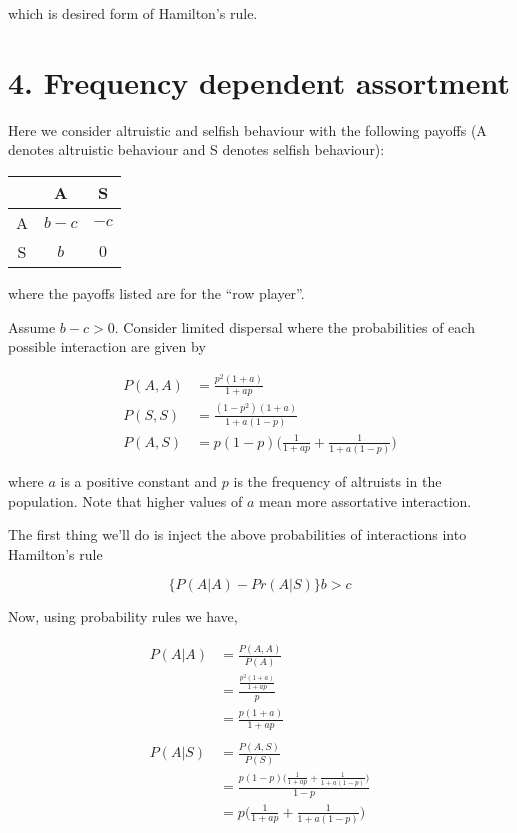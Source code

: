 \documentclass{article}
\begin{document}
which is desired form of Hamilton's rule.

\section*{4. Frequency dependent assortment}

Here we consider altruistic and selfish behaviour with the following
payoffs (A denotes altruistic behaviour and S denotes selfish
behaviour):

\begin{center}
\begin{tabular}{ccc}
    & A & S \\
    \hline
    A & $b - c$ & $-c$ \\
    S & $b$ & $0$ \\
    \hline
\end{tabular}
\end{center}

where the payoffs listed are for the ``row player''.

Assume $b - c > 0$. Consider limited dispersal where the probabilities
of each possible interaction are given by

\begin{align*}
    P(A,A) &= \frac{p^2 (1 + a)}{1 + a p} \\
    P(S,S) &= \frac{(1 - p^2) (1 + a)}{1 + a (1 - p)} \\
    P(A,S) &= p (1 - p) \bigg(\frac{1}{1 + a p} + \frac{1}{1 + a (1 - p)}\bigg)
\end{align*}

where $a$ is a positive constant and $p$ is the frequency of altruists
in the population. Note that higher values of $a$ mean more assortative
interaction.

The first thing we'll do is inject the above probabilities of
interactions into Hamilton's rule

\begin{equation*}
    \{P(A|A) - Pr(A|S)\} b > c
\end{equation*}

Now, using probability rules we have,

\begin{align*}
    P(A|A) &= \frac{P(A,A)}{P(A)} \\
           &= \frac{\frac{p^2 (1 + a)}{1 + a p}}{p} \\
           &= \frac{p (1 + a)}{1 + a p} \\ \\
    P(A|S) &= \frac{P(A,S)}{P(S)} \\
           &= \frac{p (1 - p) \Big(\frac{1}{1 + a p} + \frac{1}{1 + a (1 - p)}\Big)}{1 - p} \\
           &= p \bigg(\frac{1}{1 + a p} + \frac{1}{1 + a (1 - p)}\bigg)
\end{align*}
\end{document}
